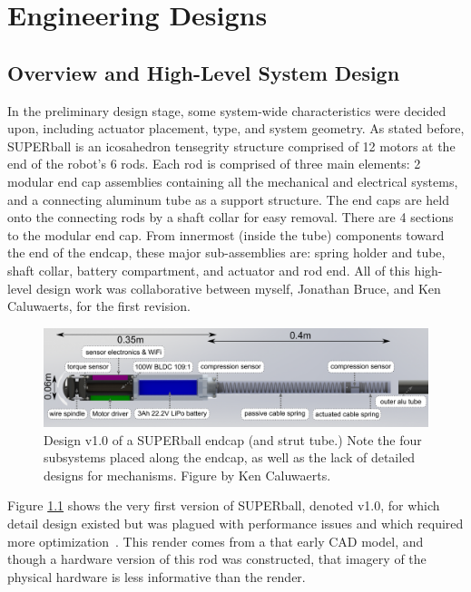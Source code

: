 \documentclass[12pt]{report}
\begin{document}

\chapter{Engineering Designs}

\section{Overview and High-Level System Design}

In the preliminary design stage, some system-wide characteristics were decided upon, including actuator placement, type, and system geometry.
As stated before, SUPERball is an icosahedron tensegrity structure comprised of 12 motors at the end of the robot's 6 rods.
Each rod is comprised of three main elements: 2 modular end cap assemblies containing all the mechanical and electrical systems, and a connecting aluminum tube as a support structure.
The end caps are held onto the connecting rods by a shaft collar for easy removal.
There are 4 sections to the modular end cap.
From innermost (inside the tube) components toward the end of the endcap, these major sub-assemblies are: spring holder and tube, shaft collar, battery compartment, and actuator and rod end.
All of this high-level design work was collaborative between myself, Jonathan Bruce, and Ken Caluwaerts, for the first revision.

\begin{figure}[thpb]
      \centering
      \includegraphics[width=0.9\columnwidth]{img/strut.png}
      \caption{Design v1.0 of a SUPERball endcap (and strut tube.) Note the four subsystems placed along the endcap, as well as the lack of detailed designs for mechanisms. Figure by Ken Caluwaerts.~\cite{bruce2014design,sabelhaus2014hardware}}
      \label{fig:strutrender}
      \vspace{-0.2cm}
\end{figure}

Figure \ref{fig:strutrender} shows the very first version of SUPERball, denoted v1.0, for which detail design existed but was plagued with performance issues and which required more optimization~\cite{bruce2014design}.
This render comes from a that early CAD model, and though a hardware version of this rod was constructed, that imagery of the physical hardware is less informative than the render.
\end{document}
